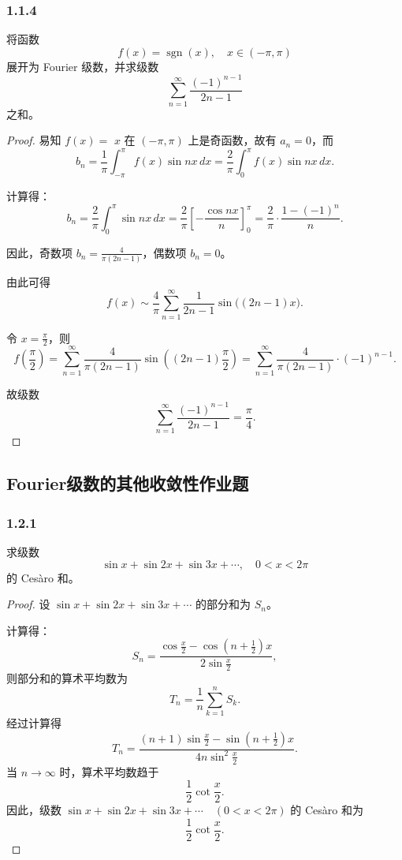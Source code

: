 \documentclass[12pt]{ctexart}
\begin{document}
\subsubsection*{1.1.4}
将函数
\[
f(x) = \operatorname{sgn}(x), \quad x \in (-\pi, \pi)
\]
展开为 Fourier 级数，并求级数
\[
\sum_{n=1}^\infty \frac{(-1)^{n-1}}{2n-1}
\]
之和。
\begin{proof}
易知 $f(x) =$  $x$ 在 $(-\pi, \pi)$ 上是奇函数，故有 $a_n = 0$，而
\[
b_n = \frac{1}{\pi} \int_{-\pi}^\pi f(x) \sin nx \, dx = \frac{2}{\pi} \int_0^\pi f(x) \sin nx \, dx.
\]

计算得：
\[
b_n = \frac{2}{\pi} \int_0^\pi \sin nx \, dx = \frac{2}{\pi} \left[-\frac{\cos nx}{n} \right]_0^\pi
= \frac{2}{\pi} \cdot \frac{1 - (-1)^n}{n}.
\]

因此，奇数项 $b_n = \frac{4}{\pi (2n-1)}$，偶数项 $b_n = 0$。

由此可得
\[
f(x) \sim \frac{4}{\pi} \sum_{n=1}^\infty \frac{1}{2n-1} \sin \big((2n-1)x\big).
\]

令 $x = \frac{\pi}{2}$，则
\[
f\left(\frac{\pi}{2}\right) = \sum_{n=1}^\infty \frac{4}{\pi (2n-1)} \sin\left((2n-1) \frac{\pi}{2}\right)
= \sum_{n=1}^\infty \frac{4}{\pi (2n-1)} \cdot (-1)^{n-1}.
\]

故级数
\[
\sum_{n=1}^\infty \frac{(-1)^{n-1}}{2n-1} = \frac{\pi}{4}.
\]
\end{proof}



\subsection{Fourier级数的其他收敛性作业题}
\subsubsection*{1.2.1}
求级数
\[
\sin x + \sin 2x + \sin 3x + \cdots, \quad 0 < x < 2\pi
\]
的 Cesàro 和。
\begin{proof}
设 $\sin x + \sin 2x + \sin 3x + \cdots$ 的部分和为 $S_n$。

计算得：
\[
S_n = \frac{\cos \frac{x}{2} - \cos \left(n+\frac{1}{2}\right)x}{2 \sin \frac{x}{2}},
\]
则部分和的算术平均数为
\[
T_n = \frac{1}{n} \sum_{k=1}^n S_k.
\]
经过计算得
\[
T_n = \frac{(n+1)\sin \frac{x}{2} - \sin \left(n+\frac{1}{2}\right)x}{4n \sin^2 \frac{x}{2}}.
\]
当 $n \to \infty$ 时，算术平均数趋于
\[
\frac{1}{2} \cot \frac{x}{2}.
\]
因此，级数 $\sin x + \sin 2x + \sin 3x + \cdots \quad (0 < x < 2\pi)$ 的 Cesàro 和为
\[
\frac{1}{2} \cot \frac{x}{2}.
\]
\end{proof}
\end{document}
